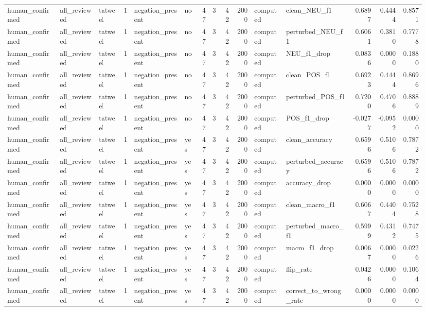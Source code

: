 \begin{tabular}{lllrllrrrrllrrr}
human_confirmed & all_reviewed & tatweel & 1 & negation_present & no & 47 & 3 & 42 & 2000 & computed & clean_NEU_f1 & 0.6897 & 0.4444 & 0.8571 \\
human_confirmed & all_reviewed & tatweel & 1 & negation_present & no & 47 & 3 & 42 & 2000 & computed & perturbed_NEU_f1 & 0.6061 & 0.3810 & 0.7778 \\
human_confirmed & all_reviewed & tatweel & 1 & negation_present & no & 47 & 3 & 42 & 2000 & computed & NEU_f1_drop & 0.0836 & 0.0000 & 0.1880 \\
human_confirmed & all_reviewed & tatweel & 1 & negation_present & no & 47 & 3 & 42 & 2000 & computed & clean_POS_f1 & 0.6923 & 0.4444 & 0.8696 \\
human_confirmed & all_reviewed & tatweel & 1 & negation_present & no & 47 & 3 & 42 & 2000 & computed & perturbed_POS_f1 & 0.7200 & 0.4706 & 0.8889 \\
human_confirmed & all_reviewed & tatweel & 1 & negation_present & no & 47 & 3 & 42 & 2000 & computed & POS_f1_drop & -0.0277 & -0.0952 & 0.0000 \\
human_confirmed & all_reviewed & tatweel & 1 & negation_present & yes & 47 & 3 & 42 & 2000 & computed & clean_accuracy & 0.6596 & 0.5106 & 0.7872 \\
human_confirmed & all_reviewed & tatweel & 1 & negation_present & yes & 47 & 3 & 42 & 2000 & computed & perturbed_accuracy & 0.6596 & 0.5106 & 0.7872 \\
human_confirmed & all_reviewed & tatweel & 1 & negation_present & yes & 47 & 3 & 42 & 2000 & computed & accuracy_drop & 0.0000 & 0.0000 & 0.0000 \\
human_confirmed & all_reviewed & tatweel & 1 & negation_present & yes & 47 & 3 & 42 & 2000 & computed & clean_macro_f1 & 0.6067 & 0.4404 & 0.7528 \\
human_confirmed & all_reviewed & tatweel & 1 & negation_present & yes & 47 & 3 & 42 & 2000 & computed & perturbed_macro_f1 & 0.5999 & 0.4312 & 0.7475 \\
human_confirmed & all_reviewed & tatweel & 1 & negation_present & yes & 47 & 3 & 42 & 2000 & computed & macro_f1_drop & 0.0067 & 0.0000 & 0.0226 \\
human_confirmed & all_reviewed & tatweel & 1 & negation_present & yes & 47 & 3 & 42 & 2000 & computed & flip_rate & 0.0426 & 0.0000 & 0.1064 \\
human_confirmed & all_reviewed & tatweel & 1 & negation_present & yes & 47 & 3 & 42 & 2000 & computed & correct_to_wrong_rate & 0.0000 & 0.0000 & 0.0000 \\

\end{tabular}
